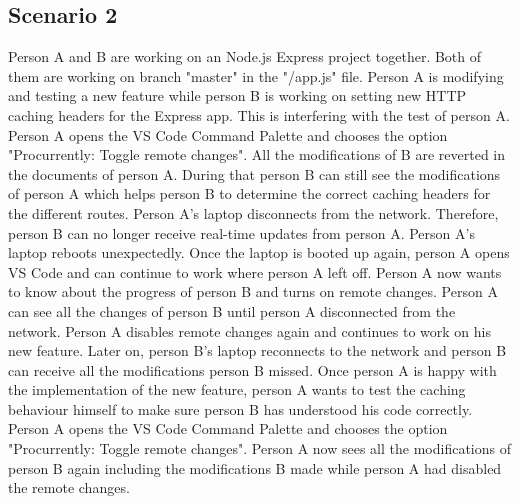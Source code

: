 \subsection{Scenario 2}
Person A and B are working on an Node.js Express project together. Both of them are working on branch "master" in the "/app.js" file.
Person A is modifying and testing a new feature while person B is working on setting new HTTP caching headers for the Express app.
This is interfering with the test of person A. Person A opens the VS Code Command Palette and chooses the option "Procurrently: Toggle remote changes".
All the modifications of B are reverted in the documents of person A.
During that person B can still see the modifications of person A which helps person B to determine the correct caching headers for the different routes.
Person A's laptop disconnects from the network. Therefore, person B can no longer receive real-time updates from person A.
Person A's laptop reboots unexpectedly. Once the laptop is booted up again, person A opens VS Code and can continue to work where person A left off.
Person A now wants to know about the progress of person B and turns on remote changes. Person A can see all the changes of person B until person A disconnected from the network. Person A disables remote changes again and continues to work on his new feature.
Later on, person B's laptop reconnects to the network and person B can receive all the modifications person B missed.
Once person A is happy with the implementation of the new feature, person A wants to test the caching behaviour himself to make sure person B has understood his code correctly.
Person A opens the VS Code Command Palette and chooses the option "Procurrently: Toggle remote changes".
Person A now sees all the modifications of person B again including the modifications B made while person A had disabled the remote changes.